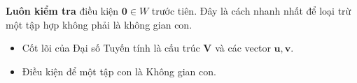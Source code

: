 \begin{warning}
\textbf{Luôn kiểm tra} điều kiện $\mathbf{0} \in W$ trước tiên. Đây là cách nhanh nhất để loại trừ một tập hợp không phải là không gian con.
\end{warning}

\begin{summary}
\begin{itemize}
    \item Cốt lõi của Đại số Tuyến tính là cấu trúc $\mathbf{V}$ và các vector $\mathbf{u}, \mathbf{v}$.
    \item Điều kiện để một tập con là Không gian con.
\end{itemize}
\end{summary}